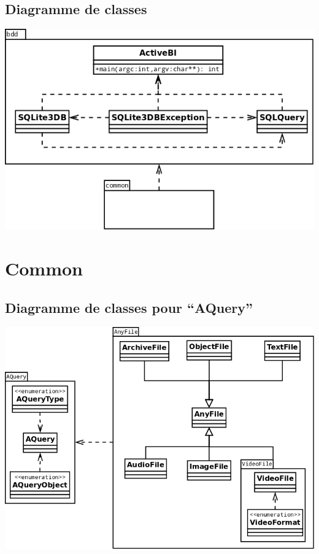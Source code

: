 \documentclass[a4paper,12pt]{report}
\begin{document}
\subsection{Diagramme de classes}\label{diagramme_classes_bi}
\begin{center}
\includegraphics[scale=0.4]{"images/diagramme_classes_bi"}
\end{center}

\section{Common}\label{common}

\subsection{Diagramme de classes pour \enquote{AQuery}}
\begin{center}
\includegraphics[scale=0.35]{"images/diagramme_classes_aquery"}
\end{center}
\end{document}
